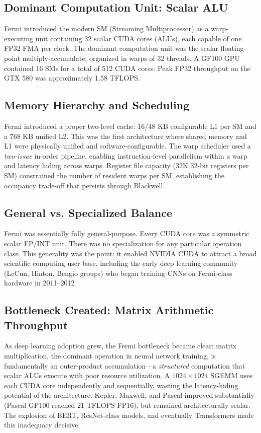 \documentclass[10pt,twocolumn]{article}
\begin{document}
\subsection{Dominant Computation Unit: Scalar ALU}

Fermi introduced the modern SM (Streaming Multiprocessor) as a warp-executing unit containing 32 scalar CUDA cores (ALUs), each capable of one FP32 FMA per clock. The dominant computation unit was the scalar floating-point multiply-accumulate, organized in warps of 32 threads. A GF100 GPU contained 16 SMs for a total of 512 CUDA cores. Peak FP32 throughput on the GTX 580 was approximately 1.58 TFLOPS.

\subsection{Memory Hierarchy and Scheduling}

Fermi introduced a proper two-level cache: 16/48 KB configurable L1 per SM and a 768 KB unified L2. This was the first architecture where shared memory and L1 were physically unified and software-configurable. The warp scheduler used a \textit{two-issue} in-order pipeline, enabling instruction-level parallelism within a warp and latency hiding across warps. Register file capacity (32K 32-bit registers per SM) constrained the number of resident warps per SM, establishing the occupancy trade-off that persists through Blackwell.

\subsection{General vs. Specialized Balance}

Fermi was essentially fully general-purpose. Every CUDA core was a symmetric scalar FP/INT unit. There was no specialization for any particular operation class. This generality was the point: it enabled NVIDIA CUDA to attract a broad scientific computing user base, including the early deep learning community (LeCun, Hinton, Bengio groups) who began training CNNs on Fermi-class hardware in 2011--2012~\citep{krizhevsky2012imagenet}.

\subsection{Bottleneck Created: Matrix Arithmetic Throughput}

As deep learning adoption grew, the Fermi bottleneck became clear: matrix multiplication, the dominant operation in neural network training, is fundamentally an outer-product accumulation—a \textit{structured} computation that scalar ALUs execute with poor resource utilization. A $1024\times1024$ SGEMM uses each CUDA core independently and sequentially, wasting the latency-hiding potential of the architecture. Kepler, Maxwell, and Pascal improved substantially (Pascal GP100 reached 21 TFLOPS FP16), but remained architecturally scalar. The explosion of BERT, ResNet-class models, and eventually Transformers made this inadequacy decisive.
\end{document}
